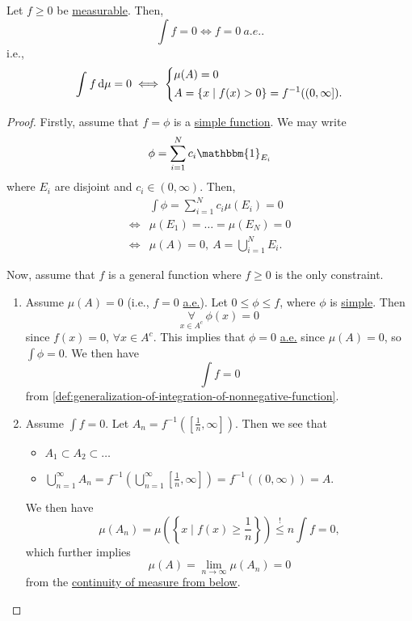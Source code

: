 \begin{proposition}\label{prop:lec12-1}
	Let \(f\geq 0\) be \hyperref[def:measurable-function]{measurable}. Then,
	\[
		\int f = 0 \iff f = 0\ \hyperref[def:mu-almost-everywhere]{a.e.}.
	\]
	i.e.,
	\[
		\int_{}^{} f \,\mathrm{d}\mu = 0 \iff \begin{dcases}
			\mu (A) = 0 \\
			A       = \left\{x \mid f(x)>0\right\} = f^{-1} ((0, \infty ]).
		\end{dcases}
	\]
\end{proposition}
\begin{proof}
	Firstly, assume that \(f = \phi \) is a \hyperref[def:simple-function]{simple function}. We may write
	\[
		\phi = \sum\limits_{i=1}^{N} c_{i}\mathbbm{1}_{E_{i}}
	\]
	where \(E_{i}\) are disjoint and \(c_{i}\in(0, \infty )\). Then,
	\[
		\begin{split}
			&\int \phi = \sum\limits_{i=1}^{N} c_{i}\mu (E_{i}) = 0\\
			\iff& \mu (E_1) = \ldots = \mu (E_{N}) = 0\\
			\iff& \mu (A) = 0,\ A = \bigcup\limits_{i=1}^{N} E_{i}.
		\end{split}
	\]

	\par Now, assume that \(f\) is a general function where \(f\geq 0\) is the only constraint.
	\begin{enumerate}
		\item Assume \(\mu (A) = 0\) (i.e., \(f = 0\) \hyperref[def:mu-almost-everywhere]{a.e.}). Let \(0\leq \phi \leq f\), where \(\phi\) is \hyperref[def:simple-function]{simple}. Then
		      \[
			      \underset{x\in A^{c} }{\forall }\ \phi (x) = 0
		      \]
		      since \(f(x) = 0\), \(\forall x\in A^{c} \). This implies that \(\phi = 0\) \hyperref[def:mu-almost-everywhere]{a.e.} since \(\mu (A) = 0\), so \(\int \phi =0\). We then have
		      \[
			      \int f = 0
		      \]
		      from \autoref{def:generalization-of-integration-of-nonnegative-function}.
		\item Assume \(\int f = 0\). Let \(A_{n} = f^{-1} \left(\left[\frac{1}{n}, \infty \right]\right)\). Then we see that
		      \begin{itemize}
			      \item \(A_1\subset A_2\subset \ldots  \)
			      \item \(\bigcup\limits_{n=1}^{\infty} A_{n} = f^{-1} \left(\bigcup\limits_{n=1}^{\infty} \left[\frac{1}{n}, \infty \right]\right) = f^{-1} ((0, \infty )) = A\).
		      \end{itemize}
		      We then have
		      \[
			      \mu (A_{n}) = \mu \left(\left\{x \mid f(x)\geq \frac{1}{n}\right\}\right) \overset{\hyperref[lma:Markov-inequality]{!}}{\leq }n \int f = 0,
		      \]
		      which further implies
		      \[
			      \mu (A) = \lim\limits_{n \to \infty} \mu (A_{n}) = 0
		      \]
		      from the \hyperref[thm:measure-space-continuity-from-below]{continuity of measure from below}.
	\end{enumerate}
\end{proof}

